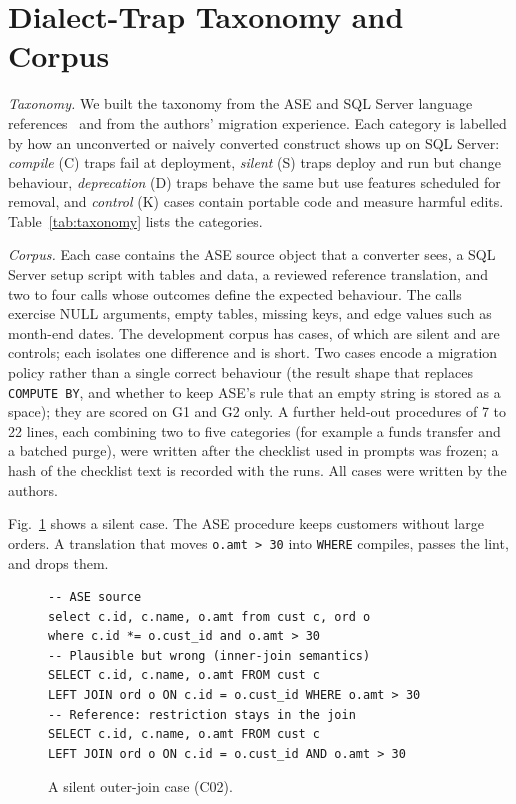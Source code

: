 \section{Dialect-Trap Taxonomy and Corpus}\label{sec:taxonomy}

\textit{Taxonomy.} We built the taxonomy from the ASE and SQL Server language
references~\cite{aseref,mstsql} and from the authors' migration experience. Each category is labelled by
how an unconverted or naively converted construct shows up on SQL Server: \emph{compile} (C) traps fail at
deployment, \emph{silent} (S) traps deploy and run but change behaviour, \emph{deprecation} (D) traps behave
the same but use features scheduled for removal, and \emph{control} (K) cases contain portable code and
measure harmful edits. Table~\ref{tab:taxonomy} lists the categories.


\textit{Corpus.} Each case contains the ASE source object that a converter sees, a SQL Server setup script
with tables and data, a reviewed reference translation, and two to four calls whose outcomes define the
expected behaviour. The calls exercise NULL arguments, empty tables, missing keys, and edge values such as
month-end dates. The development corpus has \NumDevCases{} cases, of which \NumSilentCases{} are silent and
\NumControlCases{} are controls; each isolates one difference and is short. Two cases encode a migration
policy rather than a single correct behaviour (the result shape that replaces \texttt{COMPUTE BY}, and
whether to keep ASE's rule that an empty string is stored as a space); they are scored on G1 and G2 only.
A further \NumHeldout{} held-out procedures of 7 to 22 lines, each combining two to five categories (for
example a funds transfer and a batched purge), were written after the checklist used in prompts was
frozen; a hash of the checklist text is recorded with the runs. All cases were written by the authors.

Fig.~\ref{fig:trap} shows a silent case. The ASE procedure keeps customers without large orders. A
translation that moves \texttt{o.amt > 30} into \texttt{WHERE} compiles, passes the lint, and drops them.

\begin{figure}[t]
\begin{lstlisting}
-- ASE source
select c.id, c.name, o.amt from cust c, ord o
where c.id *= o.cust_id and o.amt > 30
-- Plausible but wrong (inner-join semantics)
SELECT c.id, c.name, o.amt FROM cust c
LEFT JOIN ord o ON c.id = o.cust_id WHERE o.amt > 30
-- Reference: restriction stays in the join
SELECT c.id, c.name, o.amt FROM cust c
LEFT JOIN ord o ON c.id = o.cust_id AND o.amt > 30
\end{lstlisting}
\caption{A silent outer-join case (C02).}
\label{fig:trap}
\end{figure}

